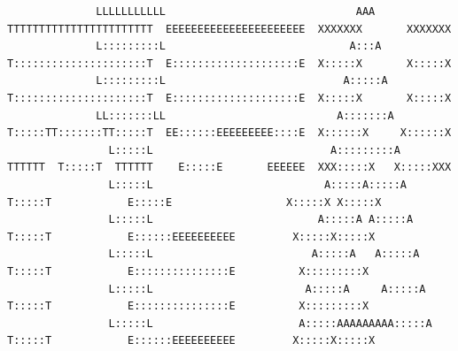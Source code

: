 \documentclass[A4 paper,openany]{book}  %
\begin{document}
\begin{titlepage}
{\begin{verbatim}
              LLLLLLLLLLL                              AAA           TTTTTTTTTTTTTTTTTTTTTTT  EEEEEEEEEEEEEEEEEEEEEE  XXXXXXX       XXXXXXX                                                                                                                                     
              L:::::::::L                             A:::A          T:::::::::::::::::::::T  E::::::::::::::::::::E  X:::::X       X:::::X                                                                                                                                     
              L:::::::::L                            A:::::A         T:::::::::::::::::::::T  E::::::::::::::::::::E  X:::::X       X:::::X                                                                                                                                     
              LL:::::::LL                           A:::::::A        T:::::TT:::::::TT:::::T  EE::::::EEEEEEEEE::::E  X::::::X     X::::::X                                                                                                                                     
                L:::::L                            A:::::::::A       TTTTTT  T:::::T  TTTTTT    E:::::E       EEEEEE  XXX:::::X   X:::::XXX                                                                                                                                     
                L:::::L                           A:::::A:::::A              T:::::T            E:::::E                  X:::::X X:::::X                                                                                                                                        
                L:::::L                          A:::::A A:::::A             T:::::T            E::::::EEEEEEEEEE         X:::::X:::::X                                                                                                                                         
                L:::::L                         A:::::A   A:::::A            T:::::T            E:::::::::::::::E          X:::::::::X                                                                                                                                          
                L:::::L                        A:::::A     A:::::A           T:::::T            E:::::::::::::::E          X:::::::::X                                                                                                                                          
                L:::::L                       A:::::AAAAAAAAA:::::A          T:::::T            E::::::EEEEEEEEEE         X:::::X:::::X                                                                                                                                         

\end{verbatim}}
\end{titlepage}
\end{document}
